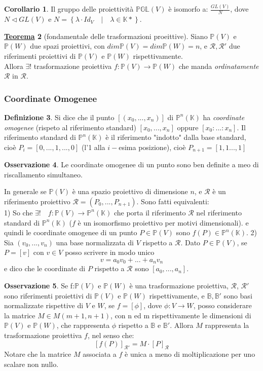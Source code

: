 \documentclass[a4paper,twoside]{article}
\newcommand{\Pro}{\mathbb{P}}
\newcommand{\K}{\mathbb{K}}
\newcommand{\B}{\mathbb{B}}
\theoremstyle{definition}
\newtheorem{theorem}{\color{Red}\underline{\textrm Teorema}}
\newtheorem{cor}[theorem]{Corollario}
\newtheorem{definizione}[theorem]{Definizione}
\newtheorem{oss}[theorem]{Osservazione}
\numberwithin{theorem}{section}
\begin{document}
\begin{cor}
    Il gruppo delle proiettività $\mathbb{PGL}(V)$ è isomorfo a: $\frac{GL(V)}{N}$, dove $N\triangleleft GL(V)$ e $N=\left\{\lambda\cdot Id_V \quad|\quad\lambda\in\K*\right\}$.
\end{cor}
\begin{theorem}[fondamentale delle trasformazioni proeittive]
Siano $\Pro(V)$ e $\Pro(W)$ due spazi proiettivi, con $dim\Pro(V)=dim\Pro(W)=n$, e $\mathcal{R},\mathcal{R'}$ due riferimenti proiettivi di $\Pro(V)$ e $\Pro(W)$ rispettivamente.\\
Allora $\exists!$ trasformazione proiettiva $f:\Pro(V)\to\Pro(W)$ che manda \emph{ordinatamente} $\mathcal{R}$ in $\mathcal{R}$.
\end{theorem}
\subsubsection{Coordinate Omogenee}
\begin{definizione}
    Si dice che il punto $[(x_0,...,x_n)]$ di $\Pro^n(\K)$ ha \emph{coordinate omogenee} (rispeto al riferimento standard) $[x_0,...,x_n]$ oppure $[x_0:...:x_n]$. Il riferimento standard di $\Pro^n(\K)$ è il riferimento "indotto" dalla base standard, cioè $P_i=[0,...,1,...,0]$ (l'1 alla $i-$esima posizione), cioè $P_{n+1}=[1,1...,1]$
\end{definizione}
\begin{oss}
    Le coordinate omogenee di un punto sono ben definite a meo di riscallamento simultaneo.
\end{oss}
In generale se $\Pro(V)$ è una spazio proiettivo di dimensione $n$, e $\mathcal{R}$ è un riferimento proiettivo $\mathcal{R}=(P_0,...,P_{n+1})$.
Sono fatti equivalenti: \\
1) So che $\exists! \quad f:\Pro(V)\to\Pro^n(\K)$ che porta il riferimento $\mathcal{R}$ nel riferimento standard di $\Pro^n(\K)$ ($f$ è un isomorfismo proiettivo per motivi dimensionali). e quindi le coordinate omogenee di un punto $P\in\Pro(V)$ sono $f(P)\in\Pro^n(\K)$.
2) Sia $(v_0,...,v_n)$ una base normalizzata di $V$ rispetto a $\mathcal{R}$. Dato $P\in\Pro(V)$, se $P=[v]$ con $v\in V$ posso scrivere in modo unico $$v=a_0v_0+...+a_nv_n$$
e dico che le coordinate di $P$ rispetto a $\mathcal{R}$ sono $[a_0,...,a_n]$. \\
\begin{oss}
    Se f:$\Pro(V)$ e $\Pro(W)$ è una trasformazione proiettiva, $\mathcal{R}$, $\mathcal{R'}$ sono riferimenti proiettivi di $\Pro(V)$ e $\Pro(W)$ rispettivamente, e $\B,\B'$ sono basi normalizzate rispettive di $V$ e $W$, se $f=[\phi]$, dove $\phi:V\to W$, posso considerare la matrice $M\in M(m+1,n+1)$, con n ed m rispettivamente le dimensioni di $\Pro(V)$ e $\Pro(W)$, che rappresenta $\phi$ rispetto a $\B$ e $\B'$. Allora $M$ rappresenta la trasformazione proiettiva $f$, nel senso che: $$[f(P)]_{\mathcal{R'}}=M\cdot[P]_\mathcal{R}$$
    Notare che la matrice $M$ associata a $f$ è unica a meno di moltiplicazione per uno scalare non nullo.
\end{oss}
\end{document}
